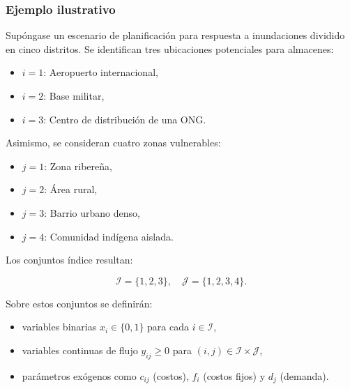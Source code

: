 \documentclass[
  spanish,
  us-letterpaper,
]{scrreprt}
\providecommand{\tightlist}{%
  \setlength{\itemsep}{0pt}\setlength{\parskip}{0pt}}
\numberwithin{equation}{section}
\begin{document}
\subsubsection{\texorpdfstring{\textbf{Ejemplo
ilustrativo}}{Ejemplo ilustrativo}}\label{ejemplo-ilustrativo}

Supóngase un escenario de planificación para respuesta a inundaciones
dividido en cinco distritos. Se identifican tres ubicaciones potenciales
para almacenes:

\begin{itemize}
\tightlist
\item
  \(i = 1\): Aeropuerto internacional,\\
\item
  \(i = 2\): Base militar,\\
\item
  \(i = 3\): Centro de distribución de una ONG.
\end{itemize}

Asimismo, se consideran cuatro zonas vulnerables:

\begin{itemize}
\tightlist
\item
  \(j = 1\): Zona ribereña,\\
\item
  \(j = 2\): Área rural,\\
\item
  \(j = 3\): Barrio urbano denso,\\
\item
  \(j = 4\): Comunidad indígena aislada.
\end{itemize}

Los conjuntos índice resultan:

\[\mathcal{I} = \{1,2,3\}, \quad 
\mathcal{J} = \{1,2,3,4\}.\]

Sobre estos conjuntos se definirán:

\begin{itemize}
\tightlist
\item
  variables binarias \(x_i \in \{0,1\}\) para cada
  \(i \in \mathcal{I}\),\\
\item
  variables continuas de flujo \(y_{ij} \ge 0\) para
  \((i,j) \in \mathcal{I} \times \mathcal{J}\),\\
\item
  parámetros exógenos como \(c_{ij}\) (costos), \(f_i\) (costos fijos) y
  \(d_j\) (demanda).
\end{itemize}
\end{document}
